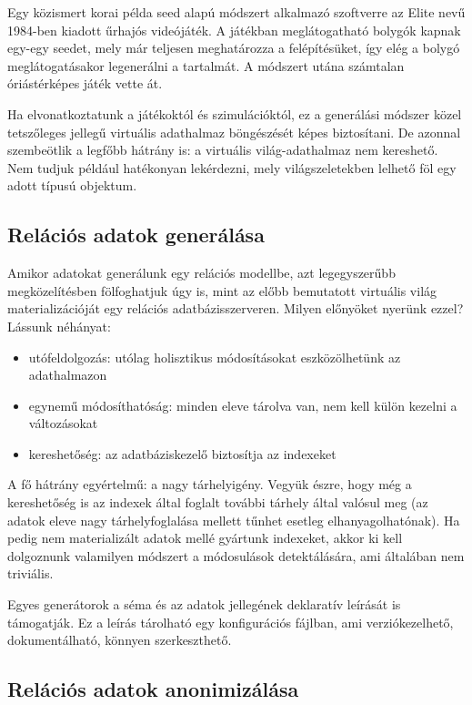 \documentclass[
    parspace,
    noindent,
    nohyp,
]{elteiktdk}[2023/04/10]
\begin{document}
Egy közismert korai példa seed alapú módszert alkalmazó szoftverre
az Elite nevű 1984-ben kiadott űrhajós videójáték.
A játékban meglátogatható bolygók kapnak egy-egy seedet, mely már teljesen meghatározza a felépítésüket,
így elég a bolygó meglátogatásakor legenerálni a tartalmát.
A módszert utána számtalan óriástérképes játék vette át.

Ha elvonatkoztatunk a játékoktól és szimulációktól,
ez a generálási módszer közel tetszőleges jellegű virtuális adathalmaz böngészését képes biztosítani.
De azonnal szembeötlik a legfőbb hátrány is: a virtuális világ-adathalmaz nem kereshető.
Nem tudjuk például hatékonyan lekérdezni, mely világszeletekben lelhető föl egy adott típusú objektum.

\subsection{Relációs adatok generálása}

Amikor adatokat generálunk egy relációs modellbe, azt legegyszerűbb megközelítésben fölfoghatjuk úgy is,
mint az előbb bemutatott virtuális világ materializációját egy relációs adatbázisszerveren.
Milyen előnyöket nyerünk ezzel? Lássunk néhányat:

\begin{itemize}
    \item utófeldolgozás: utólag holisztikus módosításokat eszközölhetünk az adathalmazon
    \item egynemű módosíthatóság: minden eleve tárolva van, nem kell külön kezelni a változásokat
    \item kereshetőség: az adatbáziskezelő biztosítja az indexeket
\end{itemize}

A fő hátrány egyértelmű: a nagy tárhelyigény.
Vegyük észre, hogy még a kereshetőség is az indexek által foglalt további tárhely által valósul meg
(az adatok eleve nagy tárhelyfoglalása mellett tűnhet esetleg elhanyagolhatónak).
Ha pedig nem materializált adatok mellé gyártunk indexeket,
akkor ki kell dolgoznunk valamilyen módszert a módosulások detektálására, ami általában nem triviális.

Egyes generátorok a séma és az adatok jellegének deklaratív leírását is támogatják. Ez a leírás tárolható egy konfigurációs fájlban, ami verziókezelhető, dokumentálható, könnyen szerkeszthető.

\subsection{Relációs adatok anonimizálása}
\end{document}
